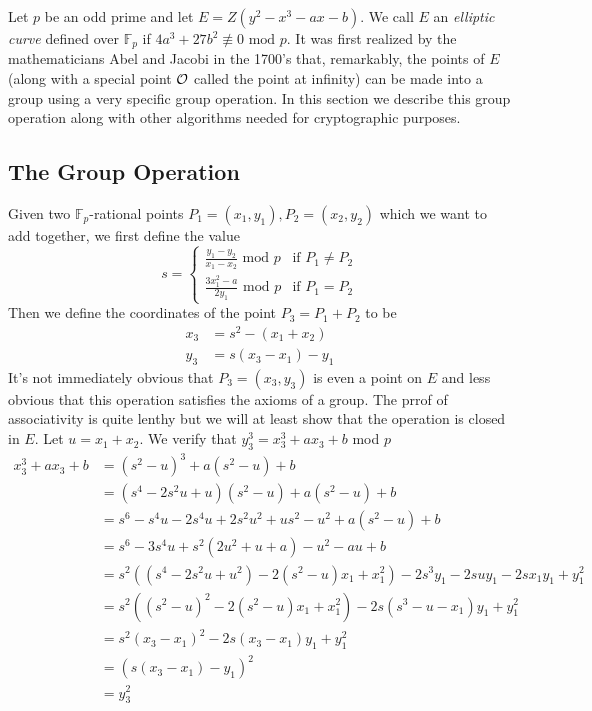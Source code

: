 Let $p$ be an odd prime and let $E = Z( y^2 - x^3 - ax - b)$. We call $E$ an \textit{elliptic curve} defined over $\mathbb{F}_p$ if $4a^3 + 27b^2 \not\equiv 0 \text{ mod } p$. It was first realized by the mathematicians Abel and Jacobi in the 1700's that, remarkably, the points of $E$ (along with a special point $\mathcal{O}$ called the point at infinity) can be made into a group using a very specific group operation. In this section we describe this group operation along with other algorithms needed for cryptographic purposes. 

\subsection{The Group Operation}  

Given two $\mathbb{F}_p$-rational points $P_1 = (x_1,y_1),P_2=(x_2,y_2)$ which we want to add together, we first define the value 
$$ s = 
\begin{cases}
\frac{y_1 - y_2}{x_1 - x_2} \text{ mod } p 	&\text{if } P_1 \neq P_2 \\
\frac{3x_1^2 - a}{2y_1} 	\text{ mod } p	&\text{if } P_1 = P_2 
\end{cases} 
$$ 
Then we define the coordinates of the point $P_3 = P_1 + P_2 $ to be 
\begin{align*}
	x_3 &= s^2 - (x_1 + x_2)  \\ 
	y_3 &=  s(x_3 - x_1) - y_1
\end{align*}
It's not immediately obvious that $P_3 = (x_3,y_3)$ is even a point on $E$ and less obvious that this operation satisfies the axioms of a group. The prrof of associativity is quite lenthy but we will at least show that the operation is closed in $E$. Let $u = x_1 + x_2$. We verify that $y_3^3 = x_3^3 + ax_3 + b$ mod $p$
\begin{align*}
	x_3^3 + ax_3 + b &= (s^2 - u)^3 +  a(s^2 - u) + b \\
	&= (s^4 - 2s^2u + u)(s^2 - u) + a(s^2 - u) + b \\
	&= s^6-s^4u-2s^4u+2s^2u^2+us^2-u^2 + a(s^2-u)+b \\
	&= s^6 - 3s^4u + s^2(2u^2 + u + a) - u^2 - au + b 					\\
	&= s^2((s^4  -2s^2u + u^2)-2(s^2 - u)x_1 + x_1^2) - 2s^3y_1 -2suy_1 -2sx_1y_1 + y_1^2 \\
	&= s^2((s^2 - u)^2 -2(s^2 - u)x_1 + x_1^2) - 2s(s^3 -u - x_1)y_1 + y_1^2 \\
	&= s^2(x_3 - x_1)^2 - 2s(x_3 - x_1)y_1 + y_1^2 \\
	&= (s(x_3 - x_1) - y_1)^2  \\ 
	&= y_3^2 
\end{align*}
